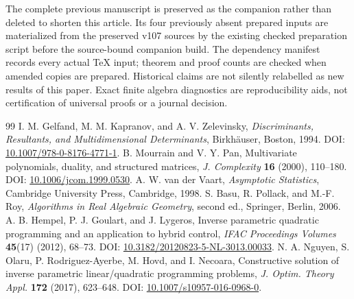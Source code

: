 \documentclass[11pt,reqno]{amsart}
\numberwithin{equation}{section}
\theoremstyle{definition}\newtheorem{definition}[theorem]{Definition}
\theoremstyle{remark}\newtheorem{remark}[theorem]{Remark}
\begin{document}
The complete previous manuscript is preserved as the companion rather than deleted to shorten this article. Its four previously absent prepared inputs are materialized from the preserved v107 sources by the existing checked preparation script before the source-bound companion build. The dependency manifest records every actual TeX input; theorem and proof counts are checked when amended copies are prepared. Historical claims are not silently relabelled as new results of this paper. Exact finite algebra diagnostics are reproducibility aids, not certification of universal proofs or a journal decision.

\begin{thebibliography}{99}
 I. M. Gelfand, M. M. Kapranov, and A. V. Zelevinsky, \emph{Discriminants, Resultants, and Multidimensional Determinants}, Birkh\"auser, Boston, 1994. DOI: \href{https://doi.org/10.1007/978-0-8176-4771-1}{10.1007/978-0-8176-4771-1}.
 B. Mourrain and V. Y. Pan, Multivariate polynomials, duality, and structured matrices, \emph{J. Complexity} \textbf{16} (2000), 110--180. DOI: \href{https://doi.org/10.1006/jcom.1999.0530}{10.1006/jcom.1999.0530}.
 A. W. van der Vaart, \emph{Asymptotic Statistics}, Cambridge University Press, Cambridge, 1998.
 S. Basu, R. Pollack, and M.-F. Roy, \emph{Algorithms in Real Algebraic Geometry}, second ed., Springer, Berlin, 2006.
 A. B. Hempel, P. J. Goulart, and J. Lygeros, Inverse parametric quadratic programming and an application to hybrid control, \emph{IFAC Proceedings Volumes} \textbf{45}(17) (2012), 68--73. DOI: \href{https://doi.org/10.3182/20120823-5-NL-3013.00033}{10.3182/20120823-5-NL-3013.00033}.
 N. A. Nguyen, S. Olaru, P. Rodriguez-Ayerbe, M. Hovd, and I. Necoara, Constructive solution of inverse parametric linear/quadratic programming problems, \emph{J. Optim. Theory Appl.} \textbf{172} (2017), 623--648. DOI: \href{https://doi.org/10.1007/s10957-016-0968-0}{10.1007/s10957-016-0968-0}.
\end{thebibliography}
\end{document}
